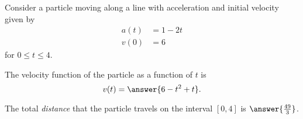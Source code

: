 \documentclass{ximera}
\author{Nela Lakos \and Kyle Parsons}
\begin{document}
\begin{exercise}

Consider a particle moving along a line with acceleration and initial velocity given by
\begin{align*}
a(t) &= 1-2t\\
v(0) &= 6
\end{align*}
for $0\leq t\leq4$.

The  velocity function of the particle as a function of $t$ is
\[
v(t) = \answer{6-t^2+t}.
\]

The total \emph{distance} that the particle travels on the interval $[0,4]$ is $\answer{\frac{49}{3}}$.

\end{exercise}
\end{document}
